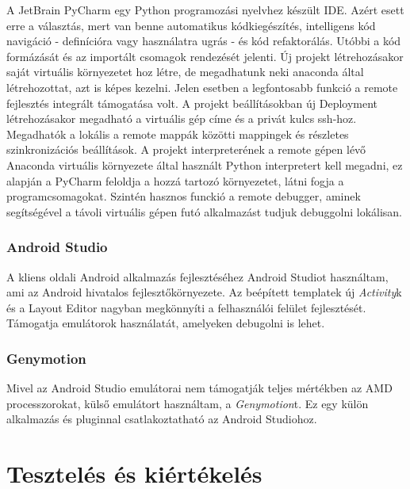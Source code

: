 A JetBrain PyCharm egy Python programozási nyelvhez készült IDE. Azért esett erre a választás, mert van benne automatikus kódkiegészítés, intelligens kód navigáció - definícióra vagy használatra ugrás - és kód refaktorálás. Utóbbi a kód formázását és az importált csomagok rendezését jelenti.
\newline
\newline
Új projekt létrehozásakor saját virtuális környezetet hoz létre, de megadhatunk neki anaconda által létrehozottat, azt is képes kezelni. Jelen esetben a legfontosabb funkció a remote fejlesztés integrált támogatása volt.
\newline
\newline
A projekt beállításokban új Deployment létrehozásakor megadható a virtuális gép címe és a privát kulcs ssh-hoz. Megadhatók a lokális a remote mappák közötti mappingek és részletes szinkronizációs beállítások. A projekt interpreterének a remote gépen lévő Anaconda virtuális környezete által használt Python interpretert kell megadni, ez alapján a PyCharm feloldja a hozzá tartozó környezetet, látni fogja a programcsomagokat.
\newline
\newline
Szintén hasznos funckió a remote debugger, aminek segítségével a távoli virtuális gépen futó alkalmazást tudjuk debuggolni lokálisan.


\subsubsection{Android Studio}

A kliens oldali Android alkalmazás fejlesztéséhez Android Studiot használtam, ami az Android hivatalos fejlesztőkörnyezete. Az beépített templatek új \emph{Activity}k és a Layout Editor nagyban megkönnyíti a felhasználói felület fejlesztését. Támogatja emulátorok használatát, amelyeken debugolni is lehet.

\subsubsection{Genymotion}

Mivel az Android Studio emulátorai nem támogatják teljes mértékben az AMD processzorokat, külső emulátort használtam, a \emph{Genymotion}t. Ez egy külön alkalmazás és pluginnal csatlakoztatható az Android Studiohoz.

\section{Tesztelés és kiértékelés}

